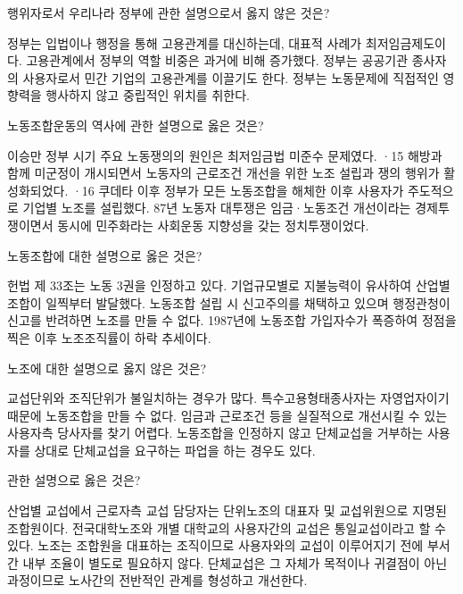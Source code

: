 \documentclass[11pt,answers]{exam} %
\begin{document}
\begin{questions}
 행위자로서 우리나라 정부에 관한 설명으로서 옳지 않은 것은?
    \begin{choices}
    \choice\relax 정부는 입법이나 행정을 통해 고용관계를 대신하는데, 대표적 사례가 최저임금제도이다.
    \choice\relax 고용관계에서 정부의 역할 비중은 과거에 비해 증가했다.
    \choice\relax 정부는 공공기관 종사자의 사용자로서 민간 기업의 고용관계를 이끌기도 한다.
    \CorrectChoice\relax 정부는 노동문제에 직접적인 영향력을 행사하지 않고 중립적인 위치를 취한다.
    \end{choices}

 노동조합운동의 역사에 관한 설명으로 옳은 것은?
    \begin{choices}
    \choice\relax 이승만 정부 시기 주요 노동쟁의의 원인은 최저임금법 미준수 문제였다.
    \choice{}·15 해방과 함께 미군정이 개시되면서 노동자의 근로조건 개선을 위한 노조 설립과 쟁의 행위가 활성화되었다.
    \choice{}·16 쿠데타 이후 정부가 모든 노동조합을 해체한 이후 사용자가 주도적으로 기업별 노조를 설립했다.
    \CorrectChoice\relax 87년 노동자 대투쟁은 임금·노동조건 개선이라는 경제투쟁이면서 동시에 민주화라는 사회운동 지향성을 갖는 정치투쟁이었다.
    \end{choices}

 노동조합에 대한 설명으로 옳은 것은?
    \begin{choices}
    \CorrectChoice\relax 헌법 제 33조는 노동 3권을 인정하고 있다.
    \choice\relax 기업규모별로 지불능력이 유사하여 산업별 조합이 일찍부터 발달했다.
    \choice\relax 노동조합 설립 시 신고주의를 채택하고 있으며 행정관청이 신고를 반려하면 노조를 만들 수 없다.
    \choice\relax 1987년에 노동조합 가입자수가 폭증하여 정점을 찍은 이후 노조조직률이 하락 추세이다.
    \end{choices}

 노조에 대한 설명으로 옳지 않은 것은?
    \begin{choices}
    \choice\relax 교섭단위와 조직단위가 불일치하는 경우가 많다.
    \CorrectChoice\relax 특수고용형태종사자는 자영업자이기 때문에 노동조합을 만들 수 없다.
    \choice\relax 임금과 근로조건 등을 실질적으로 개선시킬 수 있는 사용자측 당사자를 찾기 어렵다.
    \choice\relax 노동조합을 인정하지 않고 단체교섭을 거부하는 사용자를 상대로 단체교섭을 요구하는 파업을 하는 경우도 있다.
    \end{choices}

 관한 설명으로 옳은 것은?
    \begin{choices}
    \choice\relax 산업별 교섭에서 근로자측 교섭 담당자는 단위노조의 대표자 및 교섭위원으로 지명된 조합원이다.
    \choice\relax 전국대학노조와 개별 대학교의 사용자간의 교섭은 통일교섭이라고 할 수 있다.
    \choice\relax 노조는 조합원을 대표하는 조직이므로 사용자와의 교섭이 이루어지기 전에 부서간 내부 조율이 별도로 필요하지 않다.
    \CorrectChoice\relax 단체교섭은 그 자체가 목적이나 귀결점이 아닌 과정이므로 노사간의 전반적인 관계를 형성하고 개선한다.
    \end{choices}


\end{questions}
\end{document}
